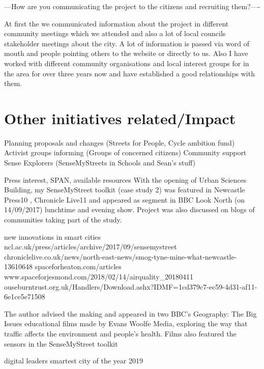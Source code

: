 ---How are you communicating the project to the citizens and recruiting them?----

At first the we communicated information about the project in different community meetings which we attended and also a lot of local councils stakeholder meetings about the city. A lot of information is passed via word of mouth and people pointing others to the website or directly to us. Also I have worked with different community organisations and local interest groups for in the area for over three years now and have established a good relationships with them.

\section{Other initiatives related/Impact}

Planning proposals and changes (Streets for People, Cycle ambition fund)
Activist groups informing (Groups of concerned citizens) 
Community support
Sense Explorers (SenseMyStreets in Schools and Sean's stuff)

Press interest, SPAN, available resources
With the opening of Urban Sciences Building, my SenseMyStreet toolkit (case study 2) was featured in Newcastle Press10 , Chronicle Live11 and appeared as segment in BBC Look North (on 14/09/2017) lunchtime and evening show. Project was also discussed on blogs of communities taking part of the study. 

new innovations in smart cities
ncl.ac.uk/press/articles/archive/2017/09/sensemystreet 
chroniclelive.co.uk/news/north-east-news/smog-tyne-mine-what-newcastle-13610648  
spaceforheaton.com/articles
www.spaceforjesmond.com/2018/02/14/airquality\_20180411
ouseburntrust.org.uk/Handlers/Download.ashx?IDMF=1cd379c7-ec59-4d31-af11-6e1ce5e71508

The author advised the making and appeared in two BBC’s Geography: The Big Issues educational films made by Evans Woolfe Media, exploring the way that traffic affects the environment and people’s health. Films also featured the sensors in the SenseMyStreet toolkit

digital leaders smartest city of the year 2019